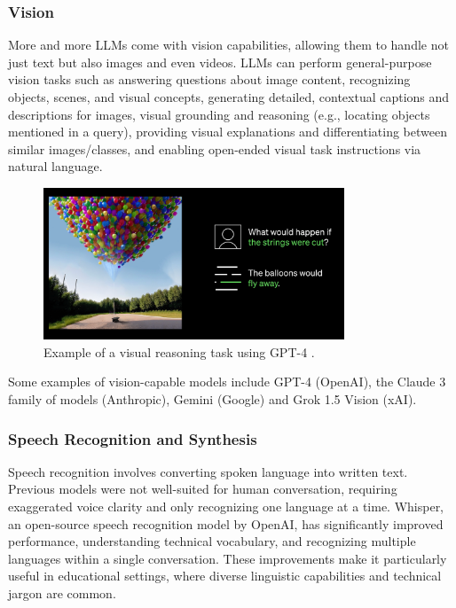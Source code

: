 \documentclass{article}
\begin{document}
\subsubsection{Vision}

More and more LLMs come with vision capabilities, allowing them to handle not just text but also images and even videos.
LLMs can perform general-purpose vision tasks such as answering questions about image content,
recognizing objects, scenes, and visual concepts, generating detailed, contextual captions
and descriptions for images, visual grounding and reasoning (e.g., locating objects mentioned in a query),
providing visual explanations and differentiating between
similar images/classes, and enabling open-ended visual
task instructions via natural language.


\begin{figure}
    \centering
    \includegraphics[width=0.8\textwidth]{images/gpt4-image-description.png}
    \caption{Example of a visual reasoning task using GPT-4 \cite{globalnews_gpt4}.}
\end{figure}


Some examples of vision-capable models include GPT-4 (OpenAI), the Claude 3 family of models (Anthropic), Gemini (Google) and Grok 1.5 Vision (xAI).

\subsubsection{Speech Recognition and Synthesis}
Speech recognition involves converting spoken language into written text. Previous models were not well-suited for human conversation, requiring exaggerated voice clarity and only recognizing one language at a time. Whisper, an open-source speech recognition model by OpenAI, has significantly improved performance, understanding technical vocabulary, and recognizing multiple languages within a single conversation. These improvements make it particularly useful in educational settings, where diverse linguistic capabilities and technical jargon are common.
\end{document}
